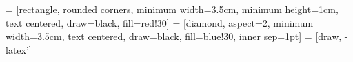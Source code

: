 \makeatletter
\def\pld@CF@loop#1+{%
\ifx\relax#1\else
	\begingroup
	\pld@AccuSetX11%
	\def\pld@frac{{}{}}\let\pld@symbols\@empty\let\pld@vars\@empty
	\pld@false
	#1%
	\let\pld@temp\@empty
	\pld@AccuIfOne{}{\pld@AccuGet\pld@temp
		\edef\pld@temp{\noexpand\pld@R\pld@temp}}%
	\pld@if \pld@Extend\pld@temp{\expandafter\pld@F\pld@frac}\fi
\expandafter\pld@CF@loop@\pld@symbols\relax\@empty
\expandafter\pld@CF@loop@\pld@vars\relax\@empty
\ifx\@empty\pld@temp
	\def\pld@temp{\pld@R11}%
\fi
\global\let\@gtempa\pld@temp
\endgroup
\ifx\@empty\@gtempa\else
	\pld@ExtendPoly\pld@tempoly\@gtempa
\fi
\expandafter\pld@CF@loop
\fi}
\def\pld@CMAddToTempoly{%
	\pld@AccuGet\pld@temp\edef\pld@temp{\noexpand\pld@R\pld@temp}%
	\pld@CondenseMonomials\pld@false\pld@symbols
	\ifx\pld@symbols\@empty \else
		\pld@ExtendPoly\pld@temp\pld@symbols
	\fi
	\ifx\pld@temp\@empty \else
		\pld@if
		\expandafter\pld@IfSum\expandafter{\pld@temp}%
		{\expandafter\def\expandafter\pld@temp\expandafter
			{\expandafter\pld@F\expandafter{\pld@temp}{}}}%
		{}%
	\fi
	\pld@ExtendPoly\pld@tempoly\pld@temp
	\pld@Extend\pld@tempoly{\pld@monom}%
	\fi}
\makeatother

\newcommand{\QED}{\begin{flushright}\(\mathfrak{QED}\)\end{flushright}}
\newcommand{\C}{\mathbb{C}}
\newcommand{\R}{\mathbb{R}}
\newcommand{\Q}{\mathbb{Q}}
\newcommand{\Z}{\mathbb{Z}}
\newcommand{\N}{\mathbb{N}}
\newcommand{\rank}{\mathrm{rank}}
\newcommand{\img}{\mathrm{img}}
\newcommand{\geo}{\mathrm{geo}}
\newcommand{\alg}{\mathrm{alg}}
\newcommand{\field}{\mathbb{F}}
\newcommand{\prob}{\mathbb{P}}
\newcommand{\expc}{\mathrm{E}}
\newcommand{\var}{\mathrm{var}}
\newcommand{\cov}{\mathrm{cov}}
\newcommand{\med}{\mathrm{med}}
\newcommand{\ind}{\mathbbm{1}}
\newcommand{\argmax}{\mathrm{argmax}}
\newcommand{\argmin}{\mathrm{argmin}}
\newcommand{\dom}{\mathrm{dom}}
\newcommand{\dig}{\mathrm{dig}}
\newcommand{\lcm}{\mathrm{lcm}}
\newcommand{\inner}[2]{\left\langle#1, #2\right\rangle}
\newcommand{\metric}[1]{\left\| #1 \right\|}

 = [rectangle, rounded corners, minimum width=3.5cm, minimum height=1cm, text centered, draw=black, fill=red!30]
 = [diamond, aspect=2, minimum width=3.5cm, text centered, draw=black, fill=blue!30, inner sep=1pt]
 = [draw, -latex']
